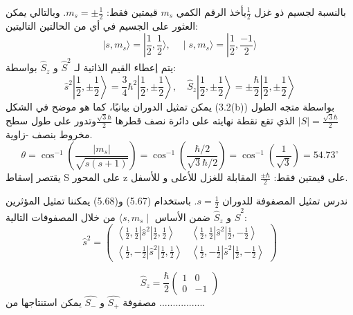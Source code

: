 بالنسبة لجسيم ذو غزل $\frac{1}{2}$يأخذ الرقم الكمي ${m}_{s}$  قيمتين فقط:  $ {m}_{s}=\pm{\frac{1}{2}}$. وبالتالي يمكن العثور على الجسيم في أي من الحالتين التاليتين:
\begin{equation}
\mid s, m_s\rangle=|\frac{1}{2}, \frac{1}{2}\rangle,\quad
\mid s, m_s\rangle=|\frac{1}{2}, \frac{-1}{2}\rangle
\end{equation}
يتم إعطاء القيم الذاتية لـ $\hat{S}^2$ و $\hat{S}_z $ بواسطة:
\begin{equation}
	\hat{s}^2\left|\frac{1}{2}, \pm \frac{1}{2}\right\rangle=\frac{3}{4} \hbar^2\left|\frac{1}{2}, \pm \frac{1}{2}\right\rangle, \quad \hat{S}_z\left|\frac{1}{2}, \pm \frac{1}{2}\right\rangle= \pm \frac{\hbar}{2}\left|\frac{1}{2}, \pm \frac{1}{2}\right\rangle
\end{equation}
يمكن تمثيل الدوران بيانيًا، كما هو موضح في الشكل (3.2(b)) بواسطة متجه الطول
 $\mid S\mid=\frac{\sqrt{3} \hbar}{2}$ 
 الذي تقع نقطة نهايته على دائرة نصف قطرها $\frac{\sqrt{3} \hbar}{2}$وتدور على طول سطح مخروط بنصف -زاوية.
\begin{equation}
	\theta=\cos ^{-1}\left(\frac{\left|m_s\right|}{\sqrt{s(s+1)}}\right)=\cos ^{-1}\left(\frac{\hbar / 2}{\sqrt{3} \hbar / 2}\right)=\cos ^{-1}\left(\frac{1}{\sqrt{3}}\right)=54.73^{\circ} 
\end{equation}
يقتصر إسقاط S على المحور z على قيمتين فقط: $\frac{\pm \hbar}{2}$ المقابلة للغزل للأعلى و للأسفل.


ندرس تمثيل المصفوفة للدوران $s=\frac{1}{2}$. باستخدام (5.67) و(5.68) يمكننا تمثيل المؤثرين $\hat{S}^2$ و $\hat{S}_z $ ضمن الأساس  $\langle s, m_s \mid$  من خلال المصفوفات التالية:
\begin{equation}
\hat{s}^2=	\left(\begin{array}{ll}
		\left\langle\frac{1}{2}, \frac{1}{2} \left|\hat{s}^2\right|\frac{1}{2},\frac{1}{2}\right\rangle & \left\langle\frac{1}{2}, \frac{1}{2} \left|\hat{s}^2\right|\frac{1}{2},-\frac{1}{2}\right\rangle \\
		\left\langle\frac{1}{2}, -\frac{1}{2} \left|\hat{s}^2\right|\frac{1}{2},\frac{1}{2}\right\rangle	 & \left\langle\frac{1}{2}, -\frac{1}{2} \left|\hat{s}^2\right|\frac{1}{2},-\frac{1}{2}\right\rangle
	\end{array}\right)	
\end{equation}

\begin{equation}
\hat{S}_z    =  \frac{ \hbar}{2}\left(\begin{array}{ll}
		1 & 0 \\
		0 & -1
	\end{array}\right)
\end{equation}
مصفوفة $\hat{S_{+}}$  و  $\hat{S_{-}}$  يمكن استنتاجها من .................


